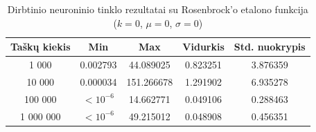 \begin{table}[H]
    \centering
    \begin{tabular}{|c|c|c|c|c|}
        \hline
        \textbf{Taškų kiekis} & \textbf{Min} & \textbf{Max} & \textbf{Vidurkis} & \textbf{Std. nuokrypis} \\ \hline
        1 000        & 0.002793 & 44.089025 & 0.823251 & 3.876359 \\ \hline
        10 000       & 0.000034 & 151.266678 & 1.291902 & 6.935278 \\ \hline
        100 000      & $<10^{-6}$ & 14.662771 & 0.049106 & 0.288463 \\ \hline
        1 000 000    & $<10^{-6}$ & 49.215012 & 0.048908 & 0.456351 \\ \hline
    \end{tabular}
    \caption{Dirbtinio neuroninio tinklo rezultatai su Rosenbrock'o etalono funkcija ($k = 0$, $\mu = 0$, $\sigma = 0$)}
\end{table}